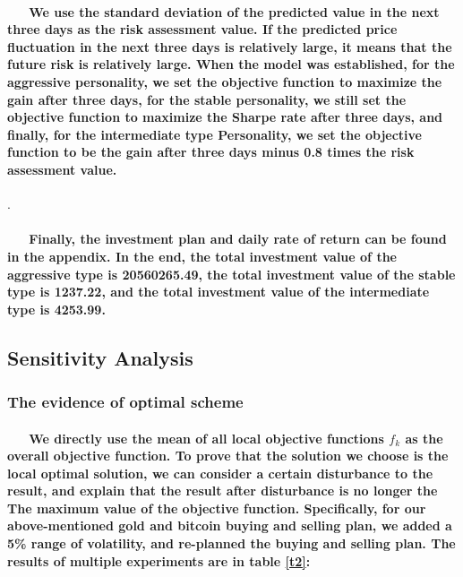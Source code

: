 \documentclass{mcmthesis}
\begin{document}
	\paragraph{
		\ \ \ We use the standard deviation of the predicted value in the next three days as the risk assessment value. If the predicted price fluctuation in the next three days is relatively large, it means that the future risk is relatively large.
		When the model was established, for the aggressive personality, we set the objective function to maximize the gain after three days, for the stable personality, we still set the objective function to maximize the Sharpe rate after three days, and finally, for the intermediate type Personality, we set the objective function to be the gain after three days minus 0.8 times the risk assessment value.
	}
		.
	\paragraph{
		\ \ \ Finally, the investment plan and daily rate of return can be found in the appendix. In the end, the total investment value of the aggressive type is 20560265.49, the total investment value of the stable type is 1237.22, and the total investment value of the intermediate type is 4253.99.
	}

	\subsection{Sensitivity Analysis }
	
	\subsubsection{The evidence of optimal scheme}
	
	\paragraph{
		\ \ \ We directly use the mean of all local objective functions $f_{k}$ as the overall objective function. To prove that the solution we choose is the local optimal solution, we can consider a certain disturbance to the result, and explain that the result after disturbance is no longer the The maximum value of the objective function. Specifically, for our above-mentioned gold and bitcoin buying and selling plan, we added a 5\% range of volatility, and re-planned the buying and selling plan. The results of multiple experiments are in table \ref{t2}: 
	}
	
\end{document}
